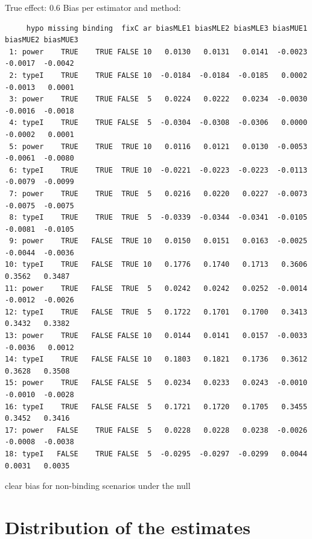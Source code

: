 \documentclass[12pt]{article}
\newcommand\Warning[1][3ex]{%
\renewcommand\stacktype{L}%
\scaleto{\stackon[1.3pt]{\color{red}$\triangle$}{\tiny\bfseries !}}{#1}%
\xspace
}
\begin{document}
True effect: 0.6
Bias per estimator and method:
\begin{adjustwidth}{-1cm}{-1cm}
\begin{verbatim}
     hypo missing binding  fixC ar biasMLE1 biasMLE2 biasMLE3 biasMUE1 biasMUE2 biasMUE3
 1: power    TRUE    TRUE FALSE 10   0.0130   0.0131   0.0141  -0.0023  -0.0017  -0.0042
 2: typeI    TRUE    TRUE FALSE 10  -0.0184  -0.0184  -0.0185   0.0002  -0.0013   0.0001
 3: power    TRUE    TRUE FALSE  5   0.0224   0.0222   0.0234  -0.0030  -0.0016  -0.0018
 4: typeI    TRUE    TRUE FALSE  5  -0.0304  -0.0308  -0.0306   0.0000  -0.0002   0.0001
 5: power    TRUE    TRUE  TRUE 10   0.0116   0.0121   0.0130  -0.0053  -0.0061  -0.0080
 6: typeI    TRUE    TRUE  TRUE 10  -0.0221  -0.0223  -0.0223  -0.0113  -0.0079  -0.0099
 7: power    TRUE    TRUE  TRUE  5   0.0216   0.0220   0.0227  -0.0073  -0.0075  -0.0075
 8: typeI    TRUE    TRUE  TRUE  5  -0.0339  -0.0344  -0.0341  -0.0105  -0.0081  -0.0105
 9: power    TRUE   FALSE  TRUE 10   0.0150   0.0151   0.0163  -0.0025  -0.0044  -0.0036
10: typeI    TRUE   FALSE  TRUE 10   0.1776   0.1740   0.1713   0.3606   0.3562   0.3487
11: power    TRUE   FALSE  TRUE  5   0.0242   0.0242   0.0252  -0.0014  -0.0012  -0.0026
12: typeI    TRUE   FALSE  TRUE  5   0.1722   0.1701   0.1700   0.3413   0.3432   0.3382
13: power    TRUE   FALSE FALSE 10   0.0144   0.0141   0.0157  -0.0033  -0.0036   0.0012
14: typeI    TRUE   FALSE FALSE 10   0.1803   0.1821   0.1736   0.3612   0.3628   0.3508
15: power    TRUE   FALSE FALSE  5   0.0234   0.0233   0.0243  -0.0010  -0.0010  -0.0028
16: typeI    TRUE   FALSE FALSE  5   0.1721   0.1720   0.1705   0.3455   0.3452   0.3416
17: power   FALSE    TRUE FALSE  5   0.0228   0.0228   0.0238  -0.0026  -0.0008  -0.0038
18: typeI   FALSE    TRUE FALSE  5  -0.0295  -0.0297  -0.0299   0.0044   0.0031   0.0035
\end{verbatim}
\end{adjustwidth}
\Warning clear bias for non-binding scenarios under the null

\clearpage

\section{Distribution of the estimates}
\label{sec:org99f8254}
\end{document}
